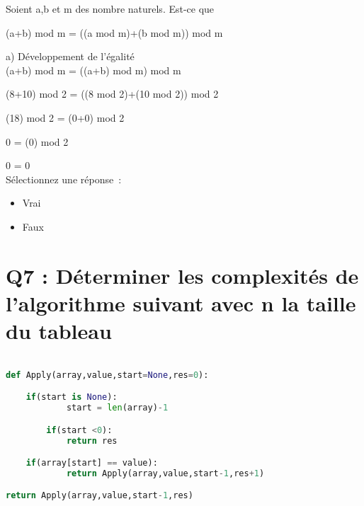 Soient a,b et m des nombre naturels. Est-ce que

\vspace{2mm} %

(a+b) mod m = ((a mod m)+(b mod m)) mod m \\

\vspace{4mm} %

a) Développement de l'égalité \\

(a+b) mod m = ((a+b) mod m) mod m

(8+10) mod 2 = ((8 mod 2)+(10 mod 2)) mod 2

(18) mod 2 = (0+0) mod 2

0 = (0) mod 2

0 = 0 \\

Sélectionnez une réponse :
\begin{itemize}[label=$\square$]
\item Vrai
\item Faux
\end{itemize}


\newpage
\section{Q7 : Déterminer les complexités de l’algorithme suivant avec n la taille du tableau}

\vspace{5mm} %

\begin{lstlisting}[language=Python, caption=Python algorithme]

def Apply(array,value,start=None,res=0):

	if(start is None):
            start = len(array)-1

        if(start <0):
            return res

	if(array[start] == value):
            return Apply(array,value,start-1,res+1)

return Apply(array,value,start-1,res)
\end{lstlisting}

\vspace{5mm} %

